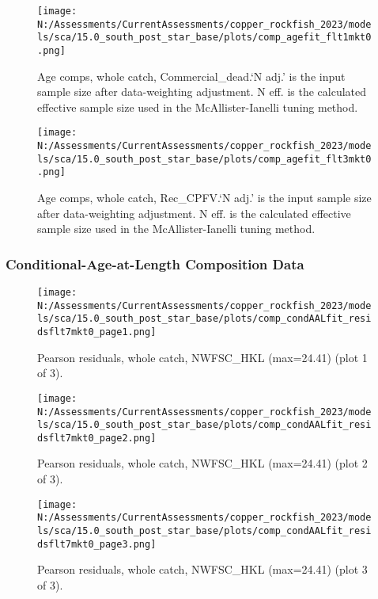 \documentclass[11pt,
  english,
  letterpaper,
]{article}
\begin{document}
\begin{figure}
\centering
\texttt{[image: N:/Assessments/CurrentAssessments/copper\_rockfish\_2023/models/sca/15.0\_south\_post\_star\_base/plots/comp\_agefit\_flt1mkt0.png]}
\caption{Age comps, whole catch, Commercial\_dead.`N adj.' is the input sample size after data-weighting adjustment. N eff. is the calculated effective sample size used in the McAllister-Ianelli tuning method.\label{fig:comp_agefit_flt1mkt0}}
\end{figure}

\begin{figure}
\centering
\texttt{[image: N:/Assessments/CurrentAssessments/copper\_rockfish\_2023/models/sca/15.0\_south\_post\_star\_base/plots/comp\_agefit\_flt3mkt0.png]}
\caption{Age comps, whole catch, Rec\_CPFV.`N adj.' is the input sample size after data-weighting adjustment. N eff. is the calculated effective sample size used in the McAllister-Ianelli tuning method.\label{fig:comp_agefit_flt3mkt0}}
\end{figure}

\newpage

\hypertarget{caal-data}{%
\subsubsection{Conditional-Age-at-Length Composition Data}\label{caal-data}}

\begin{figure}
\centering
\texttt{[image: N:/Assessments/CurrentAssessments/copper\_rockfish\_2023/models/sca/15.0\_south\_post\_star\_base/plots/comp\_condAALfit\_residsflt7mkt0\_page1.png]}
\caption{Pearson residuals, whole catch, NWFSC\_HKL (max=24.41) (plot 1 of 3).\label{fig:comp_condAALfit_residsflt7mkt0_page1}}
\end{figure}

\begin{figure}
\centering
\texttt{[image: N:/Assessments/CurrentAssessments/copper\_rockfish\_2023/models/sca/15.0\_south\_post\_star\_base/plots/comp\_condAALfit\_residsflt7mkt0\_page2.png]}
\caption{Pearson residuals, whole catch, NWFSC\_HKL (max=24.41) (plot 2 of 3).\label{fig:comp_condAALfit_residsflt7mkt0_page2}}
\end{figure}

\begin{figure}
\centering
\texttt{[image: N:/Assessments/CurrentAssessments/copper\_rockfish\_2023/models/sca/15.0\_south\_post\_star\_base/plots/comp\_condAALfit\_residsflt7mkt0\_page3.png]}
\caption{Pearson residuals, whole catch, NWFSC\_HKL (max=24.41) (plot 3 of 3).\label{fig:comp_condAALfit_residsflt7mkt0_page3}}
\end{figure}
\end{document}
